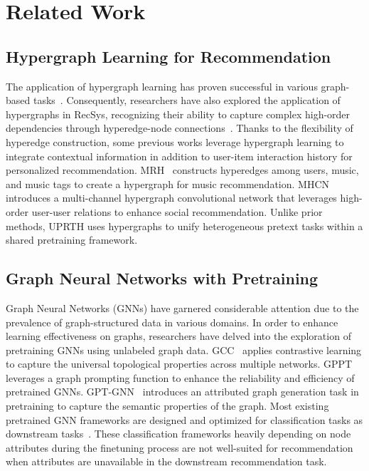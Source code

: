 \section{Related Work}
\subsection{Hypergraph Learning for Recommendation}
The application of hypergraph learning has proven successful in various graph-based tasks~\cite{feng19, gao22}. Consequently, researchers have also explored the application of hypergraphs in RecSys, recognizing their ability to capture complex high-order dependencies through hyperedge-node connections~\cite{hgcncc, hccf, dhcf, gtgs}.
Thanks to the flexibility of hyperedge construction, some previous works leverage hypergraph learning to integrate contextual information in addition to user-item interaction history for personalized recommendation. MRH~\cite{mrh} constructs hyperedges among users, music, and music tags to create a hypergraph for music recommendation. MHCN~\cite{mhcn} introduces a multi-channel hypergraph convolutional network that leverages high-order user-user relations to enhance social recommendation. Unlike prior methods, UPRTH uses hypergraphs to unify heterogeneous pretext tasks within a shared pretraining framework.

\subsection{Graph Neural Networks with Pretraining}
Graph Neural Networks (GNNs) have garnered considerable attention due to the prevalence of graph-structured data in various domains. In order to enhance learning effectiveness on graphs, researchers have delved into the exploration of pretraining GNNs using unlabeled graph data. 
GCC~\cite{gcc} applies contrastive learning to capture the universal topological properties across multiple networks. 
GPPT~\cite{gppt} leverages a graph prompting function to enhance the reliability and efficiency of pretrained GNNs. 
GPT-GNN~\cite{gptgnn} introduces an attributed graph generation task in pretraining to capture the semantic properties of the graph.
Most existing pretrained GNN frameworks are designed and optimized for classification tasks as downstream tasks~\cite{Jiang21, l2pgnn, gcc}. These classification frameworks heavily depending on node attributes during the finetuning process are not well-suited for recommendation when attributes are unavailable in the downstream recommendation task. 

